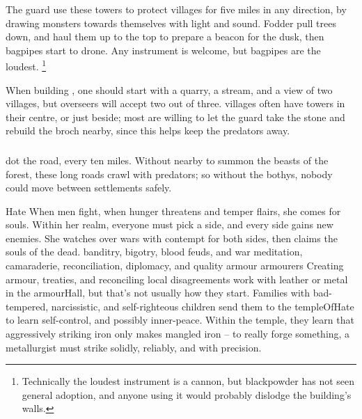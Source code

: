 \begin{multicols}{2}
The \gls{guard} use these towers to protect \glspl{village} for five miles in any direction, by drawing monsters towards themselves with light and sound.
Fodder pull trees down, and haul them up to the top to prepare a beacon for the dusk, then bagpipes start to drone.
Any instrument is welcome, but bagpipes are the loudest.%
\footnote{Technically the loudest instrument is a cannon, but blackpowder has not seen general adoption, and anyone using it would probably dislodge the building's walls.}

When building , one should start with a quarry, a stream, and a view of two \glspl{village}, but overseers will accept two out of three.
\Glspl{village} often have towers in their centre, or just beside; most are willing to let the \gls{guard} take the stone and rebuild the \gls{broch} nearby, since this helps keep the predators away.


\subsubsection{}
dot the road, every ten miles.
Without  nearby to summon the beasts of the forest, these long roads crawl with predators; so without the \glspl{bothy}, nobody could move between settlements safely.


  {Hate}%
  {When men fight, when hunger threatens and temper flairs, she comes for souls.
  Within her realm, everyone must pick a side, and every side gains new enemies.
  She watches over wars with contempt for both sides, then claims the souls of the dead.}%
  {banditry, bigotry, blood feuds, and war}%
  {meditation, camaraderie, reconciliation, diplomacy, and quality armour}%
  {\Glspl{armourer}}%
  {Creating armour, treaties, and reconciling local disagreements}%
work with leather or metal in the \gls{armourHall}, but that's not usually how they start.
Families with bad-tempered, narcissistic, and self-righteous children send them to the \gls{templeOfHate} to learn self-control, and possibly inner-peace.
Within the temple, they learn that aggressively striking iron only makes mangled iron -- to really forge something, a metallurgist must strike solidly, reliably, and with precision.


\end{multicols}
